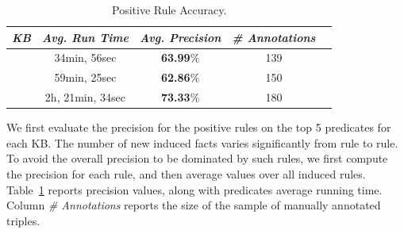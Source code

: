\begin{table}[b]
	\centering
	\caption{\krd Positive Rule Accuracy.}
		\vspace{-2ex}
	\label{tab:pos_rules_acc}
	\begin{small}
	\begin{tabular}{|c|c|c|c|c|}
		\hline
		\hline
		{\it KB}&{\it Avg. Run Time}&{\it Avg. Precision}&{\it \# Annotations} \tabularnewline
		\hline
		\dbpedia & 34min, 56sec & \textbf{63.99}\% & 139\tabularnewline
		\yago 3 &  59min, 25sec & \textbf{62.86}\% & 150\tabularnewline
		\wikidata &  2h, 21min, 34sec & \textbf{73.33}\% & 180\tabularnewline
		\hline
	\end{tabular}
	\end{small}
\end{table}


We first evaluate the precision for the positive rules on the top 5 predicates for each KB. 
The number of new induced facts varies significantly from rule to rule.
To avoid the overall precision to be dominated by such rules, we first compute the precision for each rule, 
and then average values over all induced rules.
Table~\ref{tab:pos_rules_acc} reports precision values, along with predicates average running time.
Column \emph{\# Annotations}  reports the size of the sample of manually annotated triples.



